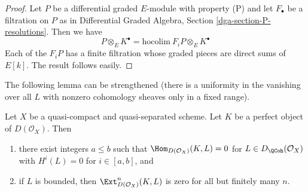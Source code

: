 \begin{proof}
Let $P$ be a differential graded $E$-module with property (P)
and let $F_\bullet$ be a filtration on $P$ as in
Differential Graded Algebra, Section \ref{dga-section-P-resolutions}.
Then we have
$$
P \otimes_E K^\bullet = \text{hocolim}\ F_iP \otimes_E K^\bullet
$$
Each of the $F_iP$ has a finite filtration whose graded pieces
are direct sums of $E[k]$. The result follows easily.
\end{proof}

\noindent
The following lemma can be strengthened (there is a uniformity
in the vanishing over all $L$ with nonzero cohomology sheaves
only in a fixed range).

\begin{lemma}
\label{lemma-ext-from-perfect-into-bounded-QCoh}
Let $X$ be a quasi-compact and quasi-separated scheme.
Let $K$ be a perfect object of $D(\mathcal{O}_X)$. Then
\begin{enumerate}
\item there exist integers $a \leq b$ such that
$\Hom_{D(\mathcal{O}_X)}(K, L) = 0$ for $L \in D_\QCoh(\mathcal{O}_X)$
with $H^i(L) = 0$ for $i \in [a, b]$, and
\item if $L$ is bounded, then $\Ext^n_{D(\mathcal{O}_X)}(K, L)$
is zero for all but finitely many $n$.
\end{enumerate}
\end{lemma}

